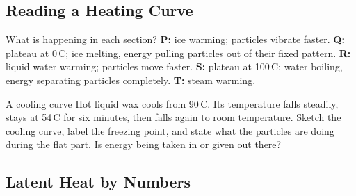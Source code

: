\label{theory:4}

\subsection{Reading a Heating Curve}\label{sub:a4.1}

\begin{center}
\end{center}

\begin{workedex}{What is happening in each section?}
\textbf{P:} ice warming; particles vibrate faster. \quad \textbf{Q:} plateau at 0\,\textdegree C; ice melting, energy pulling particles out of their fixed pattern. \quad \textbf{R:} liquid water warming; particles move faster. \quad \textbf{S:} plateau at 100\,\textdegree C; water boiling, energy separating particles completely. \quad \textbf{T:} steam warming.
\end{workedex}

\begin{wedo}{A cooling curve}
Hot liquid wax cools from 90\,\textdegree C. Its temperature falls steadily, stays at 54\,\textdegree C for six minutes, then falls again to room temperature. Sketch the cooling curve, label the freezing point, and state what the particles are doing during the flat part. Is energy being taken in or given out there?
\drawbox{6cm}{}
\end{wedo}

\subsection{Latent Heat by Numbers}\label{sub:a4.2}

